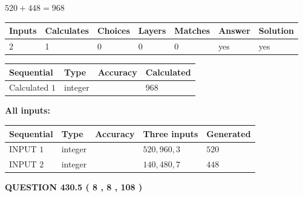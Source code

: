 \documentclass{ctexart}
\begin{document}
 

$ %
520 +  %
448=   %
968$
 
 
\noindent{}
 
 

 
   
   
   
   
\noindent\begin{tabular}{|l|l|l|l|l|l|l|}
 \hline
Inputs & Calculates & Choices & Layers & Matches & Answer & Solution \\ \hline
 2  & 
 1  & 
 0
  & 
 0  & 
 0  & 
  yes & 
  yes 
  \\ \hline
 \end{tabular}
   
   
   
   
\noindent{}
   
   
  
  
\noindent\begin{tabular}{|l|l|l|l|}
\hline
 Sequential & Type & Accuracy & Calculated \\ 
\hline
 
 
  Calculated $  1 $ & integer &  & 
  $ 968 $ 
 \\  \hline  
 \end{tabular}
   
   
   
   
\noindent\vspace{0.1in}\hspace{-0.08in} {\textbf{\Large{All inputs: }}}
   
   
  
  
\noindent\begin{tabular}{|l|l|l|l|l|}
\hline
 Sequential & Type & Accuracy & Three inputs & Generated \\ 
\hline
 
 
  INPUT $  1 $ & integer &  & $
 520
 , 
 960
 , 
 3
 $ & $ 520 $ 
 \\  \hline  
 
 
  INPUT $  2 $ & integer &  & $
 140
 , 
 480
 , 
 7
 $ & $ 448 $ 
 \\  \hline  
 \end{tabular}
   
   
  
\vspace{0.2in}
  
{\textbf{\Large{QUESTION
430.5 
 ( 8 , 8 , 108 )
}}}
  
\end{document}
